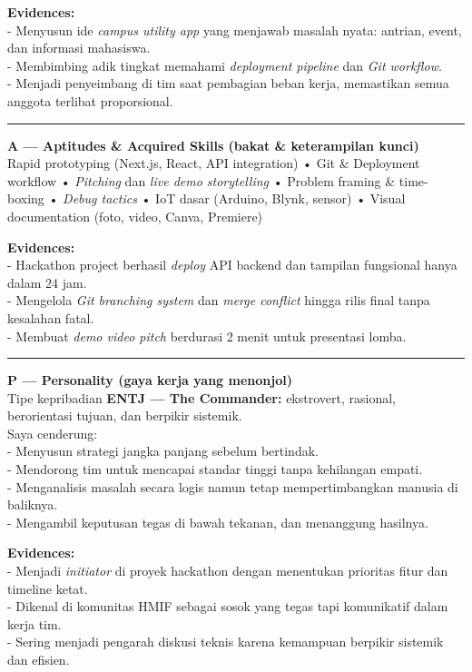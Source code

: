 \documentclass[
  letterpaper,
  DIV=11,
  numbers=noendperiod]{scrreprt}
\begin{document}
\textbf{Evidences:}\\
- Menyusun ide \emph{campus utility app} yang menjawab masalah nyata:
antrian, event, dan informasi mahasiswa.\\
- Membimbing adik tingkat memahami \emph{deployment pipeline} dan
\emph{Git workflow}.\\
- Menjadi penyeimbang di tim saat pembagian beban kerja, memastikan
semua anggota terlibat proporsional.

\begin{center}\rule{0.5\linewidth}{0.5pt}\end{center}

\textbf{A --- Aptitudes \& Acquired Skills (bakat \& keterampilan
kunci)}\\
Rapid prototyping (Next.js, React, API integration) • Git \& Deployment
workflow • \emph{Pitching} dan \emph{live demo storytelling} • Problem
framing \& time-boxing • \emph{Debug tactics} • IoT dasar (Arduino,
Blynk, sensor) • Visual documentation (foto, video, Canva, Premiere)

\textbf{Evidences:}\\
- Hackathon project berhasil \emph{deploy} API backend dan tampilan
fungsional hanya dalam 24 jam.\\
- Mengelola \emph{Git branching system} dan \emph{merge conflict} hingga
rilis final tanpa kesalahan fatal.\\
- Membuat \emph{demo video pitch} berdurasi 2 menit untuk presentasi
lomba.

\begin{center}\rule{0.5\linewidth}{0.5pt}\end{center}

\textbf{P --- Personality (gaya kerja yang menonjol)}\\
Tipe kepribadian \textbf{ENTJ --- The Commander:} ekstrovert, rasional,
berorientasi tujuan, dan berpikir sistemik.\\
Saya cenderung:\\
- Menyusun strategi jangka panjang sebelum bertindak.\\
- Mendorong tim untuk mencapai standar tinggi tanpa kehilangan empati.\\
- Menganalisis masalah secara logis namun tetap mempertimbangkan manusia
di baliknya.\\
- Mengambil keputusan tegas di bawah tekanan, dan menanggung hasilnya.

\textbf{Evidences:}\\
- Menjadi \emph{initiator} di proyek hackathon dengan menentukan
prioritas fitur dan timeline ketat.\\
- Dikenal di komunitas HMIF sebagai sosok yang tegas tapi komunikatif
dalam kerja tim.\\
- Sering menjadi pengarah diskusi teknis karena kemampuan berpikir
sistemik dan efisien.
\end{document}
